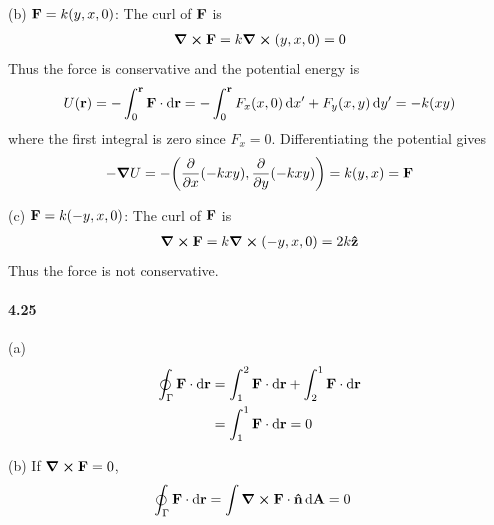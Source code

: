 \documentclass[../problems.tex]{subfiles}
\begin{document}
(b) $\vb{F} = k(y, x, 0)$: The curl of $\vb{F}$ is
\begin{align*}
    \curl{\vb{F}} = k \curl{(y, x, 0)} = 0
\end{align*}
Thus the force is conservative and the potential energy is
\begin{align*}
    U(\vb{r}) = - \int_0^{\vb{r}} \vb{F} \cdot \dd{\vb{r}}
    = -\int_0^{\vb{r}} F_x(x, 0) \dd{x'} + F_y(x, y) \dd{y'}
    = -k(xy)
\end{align*}
where the first integral is zero since $F_x = 0$. Differentiating the potential gives
\begin{align*}
    -\grad{U} = -\quantity(\pdv{x}(-kxy), \pdv{y}(-kxy)) = k(y, x) = \vb{F}
\end{align*}

(c) $\vb{F} = k(-y, x, 0)$: The curl of $\vb{F}$ is
\begin{align*}
    \curl{\vb{F}} = k \curl{(-y, x, 0)} = 2k \vu{z}
\end{align*}
Thus the force is not conservative.

\paragraph{4.25}
(a)
\begin{align*}
    \oint_\Gamma \vb{F} \cdot \dd{\vb{r}} &= \int_1^2 \vb{F} \cdot \dd{\vb{r}}
        + \int_2^1 \vb{F} \cdot \dd{\vb{r}} \\
    &= \int_1^1 \vb{F} \cdot \dd{\vb{r}} = 0
\end{align*}

(b)
If $\curl{\vb{F}} = 0$,
\begin{align*}
    \oint_\Gamma \vb{F} \cdot \dd{\vb{r}} &= \int \curl{\vb{F}} \cdot \vu{n} \dd{\vb{A}}
    = 0
\end{align*}
\end{document}
